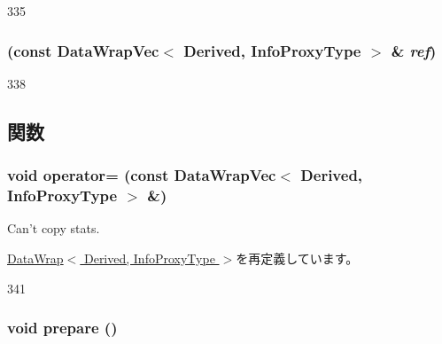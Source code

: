 \begin{DoxyCode}
335     {}
\end{DoxyCode}
\hypertarget{classStats_1_1DataWrapVec_a55303c51e3102bd23db709edf940bd77}{
\subsubsection[{DataWrapVec}]{ (const {\bf DataWrapVec}$<$ Derived, InfoProxyType $>$ \& {\em ref})}}
\label{classStats_1_1DataWrapVec_a55303c51e3102bd23db709edf940bd77}



\begin{DoxyCode}
338     {}
\end{DoxyCode}


\subsection{関数}
\hypertarget{classStats_1_1DataWrapVec_ab855679d4219fb17e9dc46c572193966}{
\subsubsection[{operator=}]{\setlength{\rightskip}{0pt plus 5cm}void operator= (const {\bf DataWrapVec}$<$ Derived, InfoProxyType $>$ \&)}}
\label{classStats_1_1DataWrapVec_ab855679d4219fb17e9dc46c572193966}
Can't copy stats. 

\hyperlink{classStats_1_1DataWrap_abbb367287ae111264a1f2e657b5f8f36}{DataWrap$<$ Derived, InfoProxyType $>$}を再定義しています。


\begin{DoxyCode}
341     {}
\end{DoxyCode}
\hypertarget{classStats_1_1DataWrapVec_a1825b40ca3bc3a1ba67fdb58fac5015c}{
\subsubsection[{prepare}]{\setlength{\rightskip}{0pt plus 5cm}void prepare ()}}
\label{classStats_1_1DataWrapVec_a1825b40ca3bc3a1ba67fdb58fac5015c}


